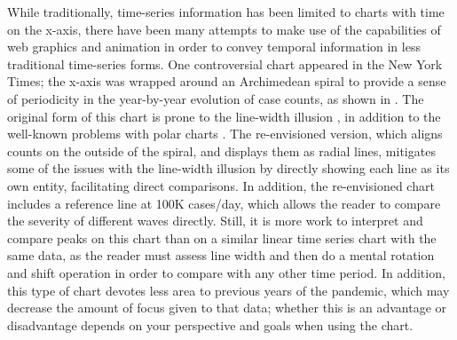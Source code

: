 \documentclass[article]{jdssv}\usepackage[]{graphicx}\usepackage[]{color}
\begin{document}
While traditionally, time-series information has been limited to charts with time on the x-axis, there have been many attempts to make use of the capabilities of web graphics and animation in order to convey temporal information in less traditional time-series forms. One controversial chart appeared in the New York Times; the x-axis was wrapped around an Archimedean spiral to provide a sense of periodicity in the year-by-year evolution of case counts, as shown in . The original form of this chart is prone to the line-width illusion \citep{vanderplasSignsSineIllusion2015}, in addition to the well-known problems with polar charts \citep{hofmannGraphicalTestsPower2012,waldnerComparisonRadialLinear2020}. The re-envisioned version, which aligns counts on the outside of the spiral, and displays them as radial lines, mitigates some of the issues with the line-width illusion by directly showing each line as its own entity, facilitating direct comparisons. In addition, the re-envisioned chart includes a reference line at 100K cases/day, which allows the reader to compare the severity of different waves directly. Still, it is more work to interpret and compare peaks on this chart than on a similar linear time series chart with the same data, as the reader must assess line width and then do a mental rotation and shift operation in order to compare with any other time period. In addition, this type of chart devotes less area to previous years of the pandemic, which may decrease the amount of focus given to that data; whether this is an advantage or disadvantage depends on your perspective and goals when using the chart.
\end{document}
